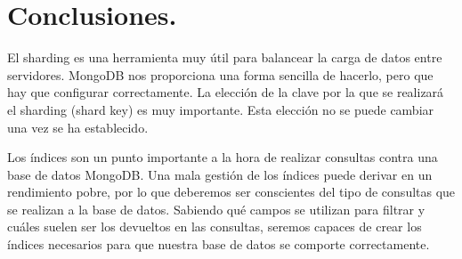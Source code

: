 \section{Conclusiones.}


El sharding es una herramienta muy útil para balancear la carga de datos entre servidores. MongoDB nos proporciona una forma sencilla de hacerlo, pero que hay que configurar correctamente. La elección de la clave por la que se realizará el sharding (shard key) es muy importante. Esta elección no se puede cambiar una vez se ha establecido.

Los índices son un punto importante a la hora de realizar consultas contra una base de datos MongoDB. Una mala gestión de los índices puede derivar en un rendimiento pobre, por lo que deberemos ser conscientes del tipo de consultas que se realizan a la base de datos. Sabiendo qué campos se utilizan para filtrar y cuáles suelen ser los devueltos en las consultas, seremos capaces de crear los índices necesarios para que nuestra base de datos se comporte correctamente.